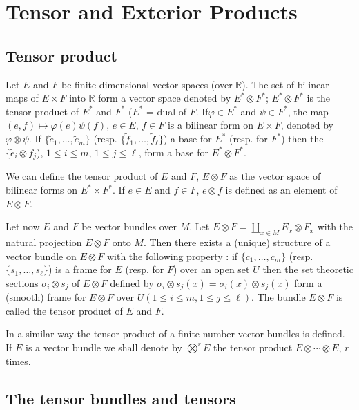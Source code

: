 \chapter{Tensor and Exterior Products}\label{chap3}

\section*{Tensor product}

Let $E$ and $F$ be finite dimensional vector spaces (over $\mathbb{R}$). The set of bilinear maps of $E\times F$ into $\mathbb{R}$ form a vector space denoted by $E^{*}\otimes F^{*}$; $E^{*}\otimes F^{*}$ is the tensor product of $E^{*}$ and $F^{*}$ ($E^{*}$ = dual of $F$. If\pageoriginale $\varphi\in E^{*}$ and $\psi\in F^{*}$, the map $(e,f)\mapsto \varphi(e)\psi(f)$, $e\in E$, $f\in F$ is a bilinear form on $E\times F$, denoted by $\varphi\otimes\psi$. If $\{\widetilde{e}_{1},\ldots,\widetilde{e}_{m}\}$ (resp. $\{\widetilde{f}_{1},\ldots,\widetilde{f}_{\ell}\}$) a base for $E^{*}$ (resp. for $F^{*}$) then the $\{\widetilde{e}_{i}\otimes \widetilde{f}_{j}$), $1\leq i\leq m$, $1\leq j\leq \ell$, form a base for $E^{*}\otimes F^{*}$.

We can define the tensor product of $E$ and $F$, $E\otimes F$ as the vector space of bilinear forms on $E^{*}\times F^{*}$. If $e\in E$ and $f\in F$, $e\otimes f$ is defined as an element of $E\otimes F$.

Let now $E$ and $F$ be vector bundles over $M$. Let $E\otimes F=\coprod\limits_{x\in M}E_{x}\otimes F_{x}$ with the natural projection $E\otimes F$ onto $M$. Then there exists a (unique) structure of a vector bundle on $E\otimes F$ with the following property : if $\{c_{1},\ldots,c_{m}\}$ (resp. $\{s_{1},\ldots,s_{\ell}\}$) is a frame for $E$ (resp. for $F$) over an open set $U$ then the set theoretic sections $\sigma_{i}\otimes s_{j}$ of $E\otimes F$ defined by $\sigma_{i}\otimes s_{j}(x)=\sigma_{i}(x)\otimes s_{j}(x)$ form a (smooth) frame for $E\otimes F$ over $U(1\leq i\leq m,1\leq j\leq \ell)$. The bundle $E\otimes F$ is called the tensor product of $E$ and $F$.

In a similar way the tensor product of a finite number vector bundles is defined. If $E$ is a vector bundle we shall denote by $\bigotimes\limits^{r} E$ the tensor product $E\otimes \cdots \otimes E$, $r$ times.

\section*{The tensor bundles and tensors}

